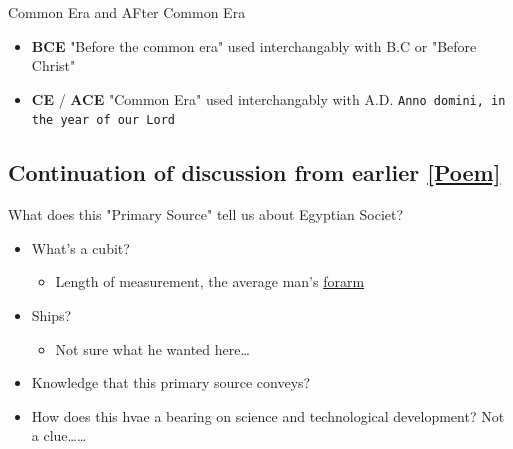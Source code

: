 \documentclass[11pt]{article}
\begin{document}
Common Era and AFter Common Era
\begin{itemize}
\item \textbf{BCE} "Before the common era" used interchangably with B.C or "Before Christ"
\item \textbf{CE} / \textbf{ACE} "Common Era" used interchangably with A.D. \texttt{Anno domini, in the year of our Lord}
\end{itemize}

\subsection{Continuation of discussion from earlier \ref{Poem}}
\label{sec-4-4}

What does this "Primary Source" tell us about Egyptian Societ?
\begin{itemize}
\item What's a cubit?
\begin{itemize}
\item Length of measurement, the average man's \uline{forarm}
\end{itemize}
\item Ships?
\begin{itemize}
\item Not sure what he wanted here\ldots{}
\end{itemize}
\item Knowledge that this primary source conveys?

\item How does this hvae a bearing on science and technological development?
Not a clue\ldots{}\ldots{}
\end{itemize}
\end{document}
